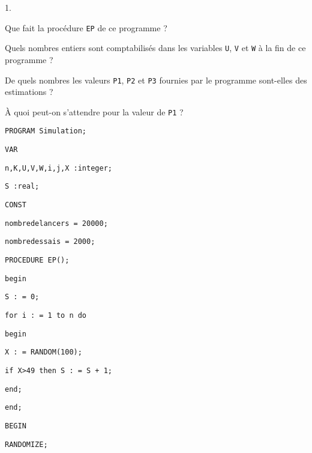 \documentclass[11pt]{article}%
\begin{document}
\begin{noliste}{1.}
 \setlength{\itemsep}{4mm}
\item {Que fait la procédure \texttt{EP} de ce programme ? }

\item {Quels nombres entiers sont comptabilisés dans les variables
\texttt{U}, \texttt{V} et \texttt{W} à la fin de ce programme ? }

\item {De quels nombres les valeurs \texttt{P1}, \texttt{P2} et
\texttt{P3}
fournies par le programme sont-elles des estimations ? }

\item {\`{A} quoi peut-on s'attendre pour la valeur de \texttt{P1} ? }

\texttt{PROGRAM Simulation;}

\texttt{\hspace{1cm}VAR}

\texttt{\hspace{1cm}n,K,U,V,W,i,j,X :integer;}

\texttt{\hspace{1cm}S :real;}

\texttt{CONST}

\texttt{\hspace{1cm}nombredelancers = 20000;}

\texttt{\hspace{1cm}nombredessais = 2000;}

\texttt{PROCEDURE EP\left(\right);}

\texttt{begin}

\texttt{\hspace{1cm}S : = 0;}

\texttt{\hspace{1cm}for i : = 1 to n do}

\texttt{\hspace{1cm}begin}

\texttt{\hspace{2cm}X : = RANDOM(100);}

\texttt{\hspace{2cm}if X>49 then S : = S + 1;}

\texttt{\hspace{1cm}end;}

\texttt{end;}

\texttt{BEGIN}

\texttt{\hspace{1cm}RANDOMIZE;}


\end{noliste}
\end{document}
